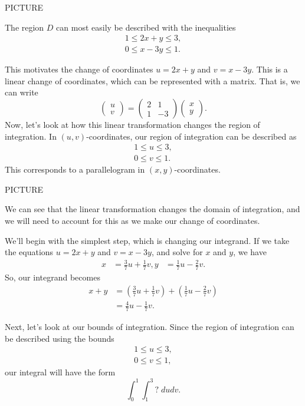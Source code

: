 \documentclass{ximera}
\begin{document}
PICTURE

The region $D$ can most easily be described with the inequalities
\begin{align*}
1\leq 2x+y \leq 3,\\
0\leq x-3y \leq 1.
\end{align*}

This motivates the change of coordinates $u=2x+y$ and $v=x-3y$. This is a linear change of coordinates, which can be represented with a matrix. That is, we can write
\[
\begin{pmatrix}
u\\ v
\end{pmatrix}
 = \begin{pmatrix}
2 & 1\\
1 & -3
\end{pmatrix}
\begin{pmatrix}
x\\ y
\end{pmatrix}.
\]
Now, let's look at how this linear transformation changes the region of integration. In $(u,v)$-coordinates, our region of integration can be described as
\begin{align*}
1\leq u \leq 3,\\
0\leq v \leq 1.
\end{align*}
This corresponds to a parallelogram in $(x,y)$-coordinates.

PICTURE

We can see that the linear transformation changes the domain of integration, and we will need to account for this as we make our change of coordinates.

We'll begin with the simplest step, which is changing our integrand. If we take the equations $u=2x+y$ and $v=x-3y$, and solve for $x$ and $y$, we have
\begin{align*}
x &= \frac{3}{7}u + \frac{1}{7}v,
y &= \frac{1}{7}u - \frac{2}{7}v.
\end{align*}
So, our integrand becomes
\begin{align*}
x+y &= \left(\frac{3}{7}u + \frac{1}{7}v\right)+\left(\frac{1}{7}u - \frac{2}{7}v\right)\\
&= \frac{4}{7}u - \frac{1}{7}v.
\end{align*}

Next, let's look at our bounds of integration. Since the region of integration can be described using the bounds
\begin{align*}
1\leq u \leq 3,\\
0\leq v \leq 1,
\end{align*}
our integral will have the form
\[
\int_0^1\int_1^3 ?\;dudv.
\]
\end{document}
